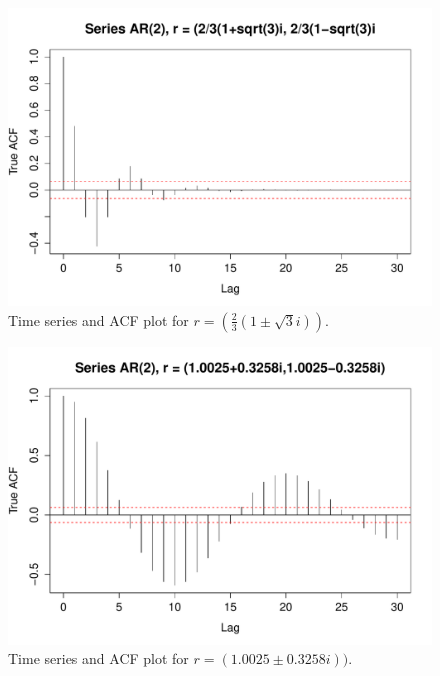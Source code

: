 \documentclass[10pt,a4paper]{article}
\begin{document}
\begin{figure}[h!]
\includegraphics[width=\linewidth]{plots/p7_img_1.pdf}
\caption{Time series and ACF plot for $r=(\frac{2}{3}(1 \pm\sqrt{3}i))$.}
\end{figure}

\begin{figure}[h!]
\includegraphics[width=\linewidth]{plots/p7_img_2.pdf}
\caption{Time series and ACF plot for $r=(1.0025 \pm0.3258i))$.}
\end{figure}
\end{document}

